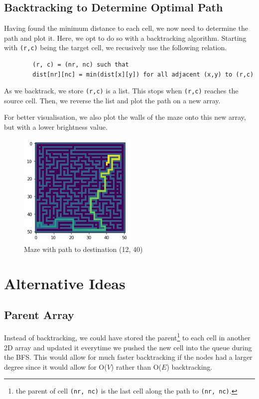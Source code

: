 \documentclass{article}
\begin{document}
    \subsection{Backtracking to Determine Optimal Path}
    Having found the minimum distance to each cell, we now need to determine the path and plot it. Here, we opt to do so with a backtracking algorithm. Starting with \texttt{(r,c)} being the target cell, we recusively use the following relation.

    \begin{verbatim}
        (r, c) = (nr, nc) such that
        dist[nr][nc] = min(dist[x][y]) for all adjacent (x,y) to (r,c)\end{verbatim}

    As we backtrack, we store \texttt{(r,c)} is a list. This stops when \texttt{(r,c)} reaches the source cell. Then, we reverse the list and plot the path on a new array.

    For better visualisation, we also plot the walls of the maze onto this new array, but with a lower brightness value.

    \begin{figure}[H]
        \centering
        \includegraphics[width=0.5\textwidth]{img/solved_maze.png}
        \caption{Maze with path to destination (12, 40)}
        \label{fig:solved_maze}
    \end{figure}

    \section{Alternative Ideas}
    \subsection{Parent Array}
    Instead of backtracking, we could have stored the parent\footnote{the parent of cell \texttt{(nr, nc)} is the last cell along the path to \texttt{(nr, nc)}.} to each cell in another 2D array and updated it everytime we pushed the new cell into the queue during the BFS. This would allow for much faster backtracking if the nodes had a larger degree since it would allow for O($V$) rather than O($E$) backtracking.
    
\end{document}

